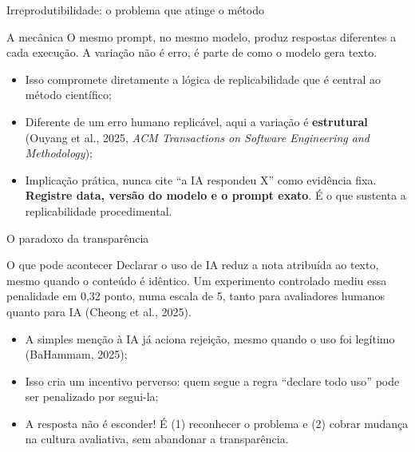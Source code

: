 \documentclass[11pt,aspectratio=169,t]{beamer}
\begin{document}
\begin{frame}{Irreprodutibilidade: o problema que atinge o método}
  \begin{alertblock}{A mecânica}
    O mesmo prompt, no mesmo modelo, produz respostas diferentes a cada execução. A variação não é erro, é parte de como o modelo gera texto.
  \end{alertblock}
  \pause
  \vfill
  \begin{itemize}
    \item Isso compromete diretamente a lógica de replicabilidade que é central ao método científico;
    \item Diferente de um erro humano replicável, aqui a variação é \textbf{estrutural} (Ouyang et al., 2025, \textit{ACM Transactions on Software Engineering and Methodology});
    \pause
    \item \alert{Implicação prática}, nunca cite ``a IA respondeu X'' como evidência fixa. \textbf{Registre data, versão do modelo e o prompt exato}. É o que sustenta a replicabilidade procedimental.
  \end{itemize}
\end{frame}
\begin{frame}{O paradoxo da transparência}
  \small
  \begin{alertblock}{O que pode acontecer}
    Declarar o uso de IA reduz a nota atribuída ao texto, mesmo quando o conteúdo é idêntico. Um experimento controlado mediu essa penalidade em 0,32 ponto, numa escala de 5, tanto para avaliadores humanos quanto para IA (Cheong et al., 2025).
  \end{alertblock}
  \pause
  \vfill
  \begin{itemize}
    \item A simples menção à IA já aciona rejeição, mesmo quando o uso foi legítimo (BaHammam, 2025);
    \item Isso cria um incentivo perverso: quem segue a regra ``declare todo uso'' pode ser penalizado por segui-la;
    \pause
    \item \alert{A resposta não é esconder!} É (1) reconhecer o problema e (2) cobrar mudança na cultura avaliativa, sem abandonar a transparência.
  \end{itemize}
\end{frame}
\end{document}
